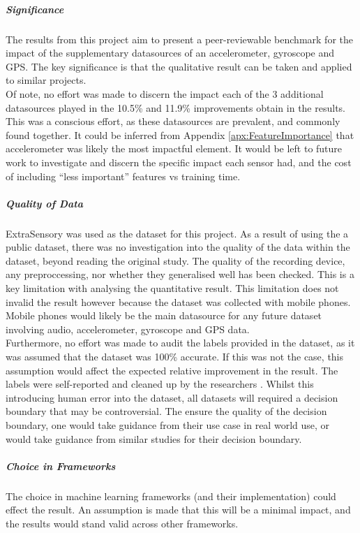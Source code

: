\documentclass{UoNMCHA}
\newcommand{\inlineQuote}[1]{``#1''}
\newcommand{\aref}[1] {Appendix \ref{#1}}
\numberwithin{equation}{section}
\begin{document}
\subparagraph{Significance}
The results from this project aim to present a peer-reviewable benchmark for the impact of the supplementary datasources of an accelerometer, gyroscope and GPS. The key significance is that the qualitative result can be taken and applied to similar projects.\\
Of note, no effort was made to discern the impact each of the 3 additional datasources played in the 10.5\% and 11.9\% improvements obtain in the results. This was a conscious effort, as these datasources are prevalent, and commonly found together. It could be inferred from \aref{apx:FeatureImportance} that accelerometer was likely the most impactful element. It would be left to future work to investigate and discern the specific impact each sensor had, and the cost of including \inlineQuote{less important} features vs training time. 

\subparagraph{Quality of Data}
ExtraSensory was used as the dataset for this project. As a result of using the a public dataset, there was no investigation into the quality of the data within the dataset, beyond reading the original study. The quality of the recording device, any preproccessing, nor whether they generalised well has been checked. This is a key limitation with analysing the quantitative result. This limitation does not invalid the result however because the dataset was collected with mobile phones. Mobile phones would likely be the main datasource for any future dataset involving audio, accelerometer, gyroscope and GPS data.\\

Furthermore, no effort was made to audit the labels provided in the dataset, as it was assumed that the dataset was 100\% accurate. If this was not the case, this assumption would affect the expected relative improvement in the result. The labels were self-reported and cleaned up by the researchers \cite{Vaizman2017}. Whilst this introducing human error into the dataset, all datasets will required a decision boundary that may be controversial. The ensure the quality of the decision boundary, one would take guidance from their use case in real world use, or would take guidance from similar studies for their decision boundary. 

\subparagraph{Choice in Frameworks}
The choice in machine learning frameworks (and their implementation) could effect the result. An assumption is made that this will be a minimal impact, and the results would stand valid across other frameworks.
\end{document}
